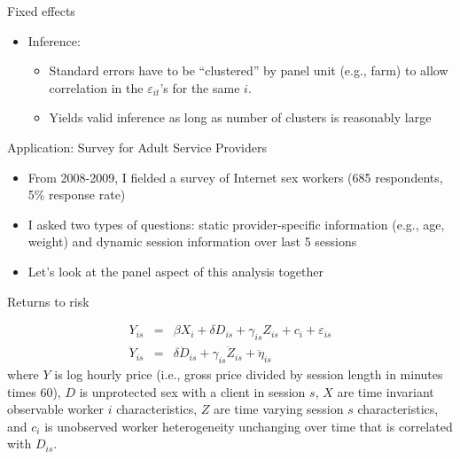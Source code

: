 \documentclass{beamer}
\begin{document}
\begin{frame}{Fixed effects}
	
	\begin{itemize}
	\item Inference:
		\begin{itemize}
		\item Standard errors have to be ``clustered'' by panel unit (e.g., farm) to allow correlation in the $\varepsilon_{it}$'s for the same $i$.
		\item Yields valid inference as long as number of clusters is reasonably large
		\end{itemize}	
	\end{itemize}
\end{frame}


\begin{frame}{Application: Survey for Adult Service Providers}

\begin{itemize}
\item From 2008-2009, I fielded a survey of Internet sex workers (685 respondents, 5\% response rate)
\item I asked two types of questions: static provider-specific information (e.g., age, weight) and dynamic session information over last 5 sessions
\item Let's look at the panel aspect of this analysis together
\end{itemize}

\end{frame}

\begin{frame}{Returns to risk}

\begin{eqnarray*}
Y_{is} &=& \beta X_i + \delta{D_{is}} + \gamma_{is} Z_{is} + c_i + \varepsilon_{is} \\
\ddot{Y}_{is} &=&  \delta \ddot{D}_{is} +  \gamma_{is} \ddot{Z}_{is} + \ddot \eta_{is}
\end{eqnarray*}where $Y$ is log hourly price (i.e., gross price divided by session length in minutes times 60), $D$ is unprotected sex with a client in session $s$,  $X$ are time invariant observable worker $i$ characteristics, $Z$ are time varying session $s$ characteristics, and $c_i$ is unobserved worker heterogeneity unchanging over time that is correlated with $D_{is}$.

\end{frame}
\end{document}
